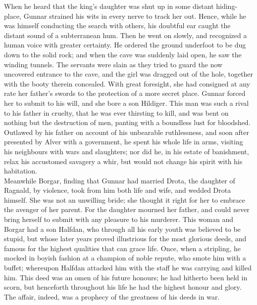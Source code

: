 \documentclass[10pt,a4paper]{report}
\begin{document}
When he heard that the king's daughter was shut up in some distant hiding-place, Gunnar strained his wits in every nerve to track her out. Hence, while he was himself conducting the search with others, his doubtful ear caught the distant sound of a subterranean hum. Then he went on slowly, and recognized a human voice with greater certainty. He ordered the ground underfoot to be dug down to the solid rock; and when the cave was suddenly laid open, he saw the winding tunnels. The servants were slain as they tried to guard the now uncovered entrance to the cave, and the girl was dragged out of the hole, together with the booty therein concealed. With great foresight, she had consigned at any rate her father's swords to the protection of a more secret place. Gunnar forced her to submit to his will, and she bore a son Hildiger. This man was such a rival to his father in cruelty, that he was ever thirsting to kill, and was bent on nothing but the destruction of men, panting with a boundless lust for bloodshed. Outlawed by his father on account of his unbearable ruthlessness, and soon after presented by Alver with a government, he spent his whole life in arms, visiting his neighbours with wars and slaughters; nor did he, in his estate of banishment, relax his accustomed savagery a whir, but would not change his spirit with his habitation.\\

Meanwhile Borgar, finding that Gunnar had married Drota, the daughter of Ragnald, by violence, took from him both life and wife, and wedded Drota himself. She was not an unwilling bride; she thought it right for her to embrace the avenger of her parent. For the daughter mourned her father, and could never bring herself to submit with any pleasure to his murderer. This woman and Borgar had a son Halfdan, who through all his early youth was believed to be stupid, but whose later years proved illustrious for the most glorious deeds, and famous for the highest qualities that can grace life. Once, when a stripling, he mocked in boyish fashion at a champion of noble repute, who smote him with a buffet; whereupon Halfdan attacked him with the staff he was carrying and killed him. This deed was an omen of his future honours; he had hitherto been held in scorn, but henceforth throughout his life he had the highest honour and glory. The affair, indeed, was a prophecy of the greatness of his deeds in war.\\
\end{document}
